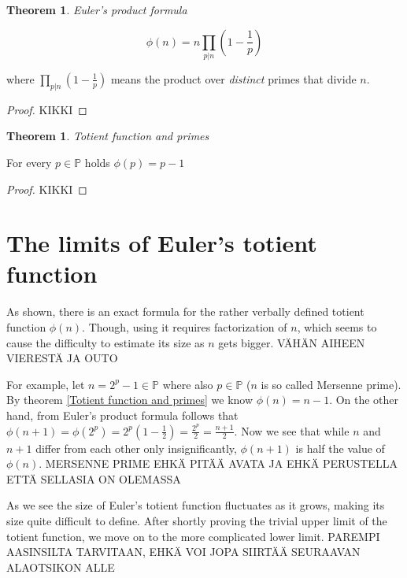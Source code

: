 \documentclass{article}
\theoremstyle{definition}
\newtheorem{theorem}[subsection]{Theorem}
\begin{document}
\newpage

\begin{theorem}{\emph{Euler's product formula}}

\begin{equation*}
    \phi(n) = n \prod_{p \vert n} (1 - \frac{1}{p})
\end{equation*}

where $\prod_{p \vert n} (1 - \frac{1}{p})$ means the product over \emph{distinct} primes that divide $n$.

\begin{proof}

KIKKI

\end{proof}

\end{theorem}

\begin{theorem}{\emph{Totient function and primes}}

For every $p \in \mathbb{P}$ holds $\phi(p) = p-1$

\begin{proof}

KIKKI

\end{proof}

\end{theorem}

\section{The limits of Euler's totient function}

As shown, there is an exact formula for the rather verbally defined totient function $\phi(n)$. Though, using it requires factorization of $n$, which seems to cause the difficulty to estimate its size as $n$ gets bigger. VÄHÄN AIHEEN VIERESTÄ JA OUTO

For example, let $n = 2^p - 1 \in \mathbb{P}$ where also $p \in \mathbb{P}$ ($n$ is so called Mersenne prime). By theorem \ref{Totient function and primes} we know $\phi(n) = n - 1$. On the other hand, from Euler's product formula follows that $\phi(n+1) = \phi(2^p) = 2^p(1-\frac{1}{2}) = \frac{2^p}{2} = \frac{n+1}{2}$. Now we see that while $n$ and $n+1$ differ from each other only insignificantly, $\phi(n+1)$ is half the value of $\phi(n)$. MERSENNE PRIME EHKÄ PITÄÄ AVATA JA EHKÄ PERUSTELLA ETTÄ SELLASIA ON OLEMASSA

As we see the size of Euler's totient function fluctuates as it grows, making its size quite difficult to define. After shortly proving the trivial upper limit of the totient function, we move on to the more complicated lower limit. PAREMPI AASINSILTA TARVITAAN, EHKÄ VOI JOPA SIIRTÄÄ SEURAAVAN ALAOTSIKON ALLE
\end{document}
